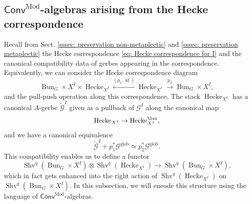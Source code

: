 \documentclass[10pt]{amsart}
\theoremstyle{remark}
\newcommand{\wt}{\widetilde}
\newcommand{\on}{\operatorname}
\newcommand{\cG}{\mathcal{G}}
\newcommand{\Shv}{\on{Shv}}
\newcommand{\id}{\on{id}}
\newcommand{\glob}{\on{glob}}
\newcommand{\Hecke}{\on{Hecke}}
\newcommand{\Bun}{\on{Bun}}
\newcommand{\ConvMod}{\mathsf{Conv}^{\on{Mod}}}
\begin{document}
\subsection{$\ConvMod$-algebras arising from the Hecke correspondence}\label{ssec: ConvMod algebra from Hecke} Recall from Sect. \ref{sssec: preservation non-metaplectic} and \ref{sssec: preservation metaplectic} the Hecke correspondence \eqref{eq: Hecke correspondence for I}
and the canonical compatibility data of gerbes appearing in the correspondence. Equivalently, we can consider the Hecke correspondence diagram 
\begin{equation}\label{eq: Hecke in a Corr form}
    \Bun_G\times X^I\times \Hecke_{X^I}\xleftarrow{(p_1,\id)} \Hecke_{X^I}\xrightarrow{p_2} \Bun_G\times X^I,
\end{equation}
and the pull-push operation along this correspondence. The stack $\Hecke_{X^I}$ has a canonical $A$-gerbe $\wt{\cG}^I$ given as a pullback of $\cG^I$ along the canonical map
\begin{equation}\label{eq: Hecke to Hecke loc}
\Hecke_{X^I}\rightarrow\Hecke^{\loc}_{X^I},
\end{equation}
and we have a canonical equivalence
\[\wt{\cG}^I+ p^*_1\cG^{\glob} \simeq p^*_2\cG^{\glob}.\]
This compatibility enables us to define a functor
\begin{equation}\label{eq: Shv Hecke action on Shv BunG}
    \Shv^q(\Bun_G\times X^I)\otimes \Shv^q(\Hecke_{X^I})\rightarrow \Shv^q(\Bun_G\times X^I),
\end{equation}
which in fact gets enhanced into the right action of $\Shv^q(\Hecke_{X^I})$ on $\Shv^q(\Bun_G\times X^I)$. In this subsection, we will encode this structure using the language of $\ConvMod$-algebras.
\end{document}
